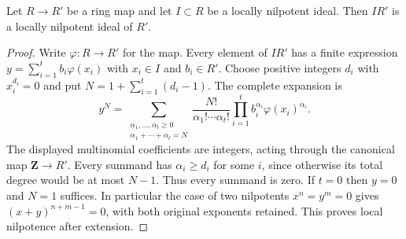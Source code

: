 \begin{lemma}
\label{lemma-locally-nilpotent}
Let $R \to R'$ be a ring map and let $I \subset R$ be a locally nilpotent
ideal. Then $IR'$ is a locally nilpotent ideal of $R'$.
\end{lemma}

\begin{proof}
Write $\varphi:R\to R'$ for the map. Every element of $IR'$ has a
finite expression $y=\sum_{i=1}^t b_i\varphi(x_i)$ with $x_i\in I$
and $b_i\in R'$. Choose positive integers $d_i$ with $x_i^{d_i}=0$
and put $N=1+\sum_{i=1}^t(d_i-1)$. The complete expansion is
$$
y^N=\sum_{\substack{\alpha_1,\ldots,\alpha_t\geq0\\
\alpha_1+\cdots+\alpha_t=N}}
\frac{N!}{\alpha_1!\cdots\alpha_t!}
\prod_{i=1}^t b_i^{\alpha_i}\varphi(x_i)^{\alpha_i}.
$$
The displayed multinomial coefficients are integers, acting through
the canonical map $\mathbf Z\to R'$. Every summand has
$\alpha_i\geq d_i$ for some $i$, since otherwise its total degree
would be at most $N-1$. Thus every summand is zero. If $t=0$ then
$y=0$ and $N=1$ suffices. In particular the case of two nilpotents
$x^n=y^m=0$ gives $(x+y)^{n+m-1}=0$, with both original exponents
retained. This proves local nilpotence after extension.
\end{proof}